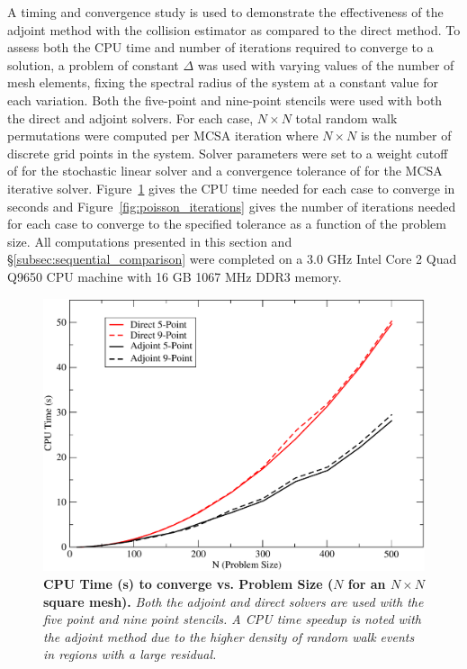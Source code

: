 A timing and convergence study is used to demonstrate the
effectiveness of the adjoint method with the collision estimator as
compared to the direct method. To assess both the CPU time and number
of iterations required to converge to a solution, a problem of
constant $\Delta$ was used with varying values of the number of mesh
elements, fixing the spectral radius of the system at a constant value
for each variation. Both the five-point and nine-point stencils were
used with both the direct and adjoint solvers. For each case, $N
\times N$ total random walk permutations were computed per MCSA
iteration where $N \times N$ is the number of discrete grid points in
the system. Solver parameters were set to a weight cutoff of
 for the stochastic linear solver and a convergence
tolerance of  for the MCSA iterative solver.
Figure~\ref{fig:poisson_cpu_time} gives the CPU time needed for each
case to converge in seconds and Figure~\ref{fig:poisson_iterations}
gives the number of iterations needed for each case to converge to the
specified tolerance as a function of the problem size. All
computations presented in this section and
\S\ref{subsec:sequential_comparison} were completed on a 3.0 GHz Intel
Core 2 Quad Q9650 CPU machine with 16 GB 1067 MHz DDR3 memory.
\begin{figure}[t!]
  \centering
  \includegraphics[width=6in,clip]{chapters/mc_background/dir_adj_cpu.pdf}
  \caption{\textbf{CPU Time (s) to converge vs. Problem Size ($N$ for
      an $N \times N$ square mesh).} \textit{Both the adjoint and
      direct solvers are used with the five point and nine point
      stencils. A CPU time speedup is noted with the adjoint method
      due to the higher density of random walk events in regions with
      a large residual.}}
  \label{fig:poisson_cpu_time}
\end{figure}

